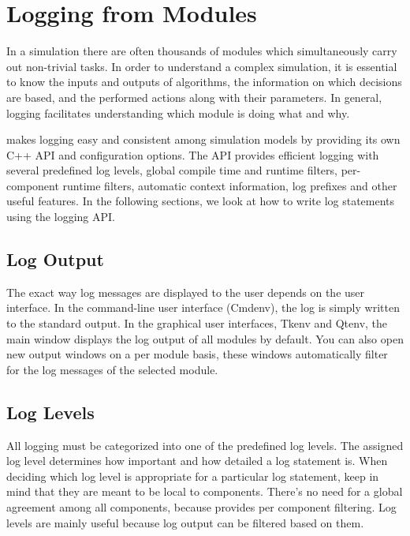 \section{Logging from Modules}

In a simulation there are often thousands of modules which simultaneously carry
out non-trivial tasks. In order to understand a complex simulation, it is
essential to know the inputs and outputs of algorithms, the information on
which decisions are based, and the performed actions along with their parameters.
In general, logging facilitates understanding which module is doing what and why.

{\opp} makes logging easy and consistent among simulation models by providing
its own C++ API and configuration options. The API provides efficient logging
with several predefined log levels, global compile time and runtime filters,
per-component runtime filters, automatic context information, log prefixes and
other useful features. In the following sections, we look at how to write log
statements using the {\opp} logging API.

\subsection{Log Output}

The exact way log messages are displayed to the user depends on the user interface.
In the command-line user interface (Cmdenv), the log is simply
written to the standard output. In the graphical user interfaces, Tkenv and Qtenv,
the main window displays the log output of all modules by default. You can also
open new output windows on a per module basis, these windows automatically filter
for the log messages of the selected module.

\subsection{Log Levels}

All logging must be categorized into one of the predefined log levels. The
assigned log level determines how important and how detailed a log statement
is. When deciding which log level is appropriate for a particular log statement,
keep in mind that they are meant to be local to components. There's no need for
a global agreement among all components, because {\opp} provides per component
filtering. Log levels are mainly useful because log output can be filtered
based on them.

